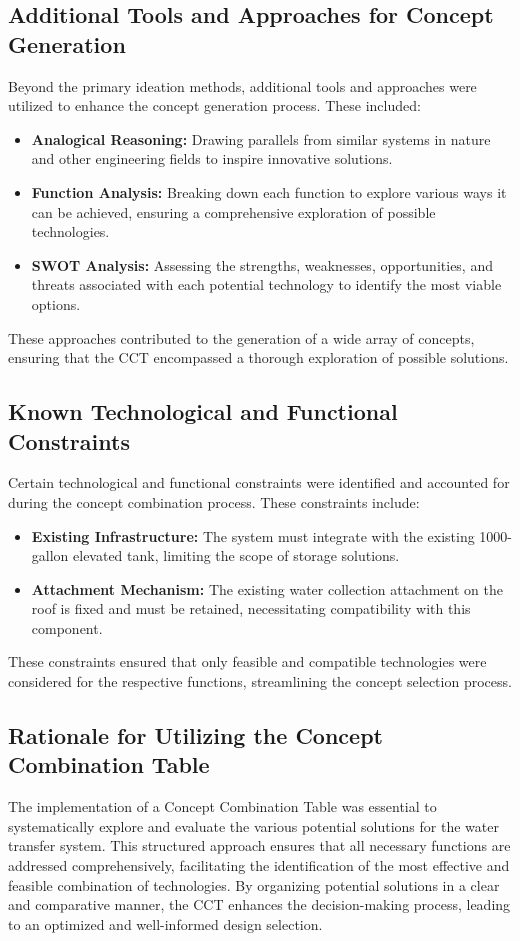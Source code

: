 \documentclass{article}
\begin{document}
\subsection{Additional Tools and Approaches for Concept Generation}
Beyond the primary ideation methods, additional tools and approaches were utilized to enhance the concept generation process. These included:

\begin{itemize}
    \item \textbf{Analogical Reasoning:} Drawing parallels from similar systems in nature and other engineering fields to inspire innovative solutions.
    \item \textbf{Function Analysis:} Breaking down each function to explore various ways it can be achieved, ensuring a comprehensive exploration of possible technologies.
    \item \textbf{SWOT Analysis:} Assessing the strengths, weaknesses, opportunities, and threats associated with each potential technology to identify the most viable options.
\end{itemize}

These approaches contributed to the generation of a wide array of concepts, ensuring that the CCT encompassed a thorough exploration of possible solutions.

\subsection{Known Technological and Functional Constraints}
Certain technological and functional constraints were identified and accounted for during the concept combination process. These constraints include:

\begin{itemize}
    \item \textbf{Existing Infrastructure:} The system must integrate with the existing 1000-gallon elevated tank, limiting the scope of storage solutions.
    \item \textbf{Attachment Mechanism:} The existing water collection attachment on the roof is fixed and must be retained, necessitating compatibility with this component.
\end{itemize}

These constraints ensured that only feasible and compatible technologies were considered for the respective functions, streamlining the concept selection process.

\subsection{Rationale for Utilizing the Concept Combination Table}
The implementation of a Concept Combination Table was essential to systematically explore and evaluate the various potential solutions for the water transfer system. This structured approach ensures that all necessary functions are addressed comprehensively, facilitating the identification of the most effective and feasible combination of technologies. By organizing potential solutions in a clear and comparative manner, the CCT enhances the decision-making process, leading to an optimized and well-informed design selection.
\end{document}

